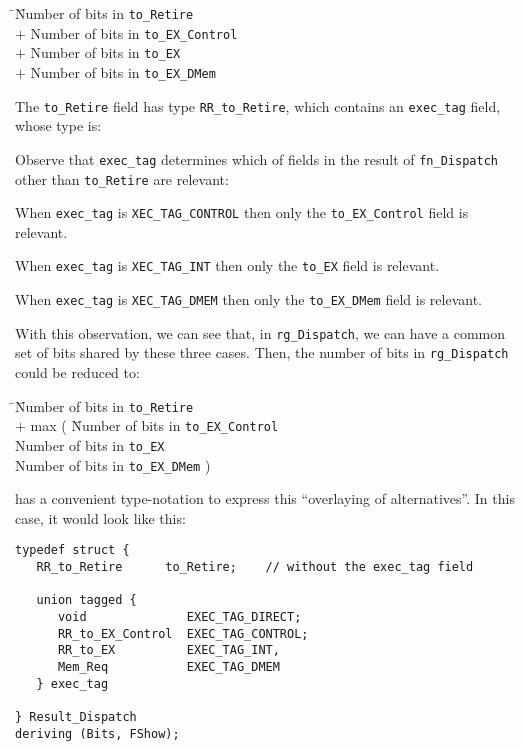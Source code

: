 \begin{tabbing}
\hmm \= \hmm \= Number of bits in {\tt to\_Retire} \\
     \> $+$  \> Number of bits in {\tt to\_EX\_Control} \\
     \> $+$  \> Number of bits in {\tt to\_EX} \\
     \> $+$  \> Number of bits in {\tt to\_EX\_DMem}
\end{tabbing}

The \verb|to_Retire| field has type \verb|RR_to_Retire|, which
contains an \verb|exec_tag| field, whose type is:


Observe that \verb|exec_tag| determines which of fields in the result
of \verb|fn_Dispatch| other than \verb|to_Retire| are relevant:

\begin{tightlist}

 \item When \verb|exec_tag| is \verb|XEC_TAG_CONTROL| then
       only the \verb|to_EX_Control| field is relevant.

 \item When \verb|exec_tag| is \verb|XEC_TAG_INT| then
       only the \verb|to_EX| field is relevant.

 \item When \verb|exec_tag| is \verb|XEC_TAG_DMEM| then
       only the \verb|to_EX_DMem| field is relevant.

\end{tightlist}

With this observation, we can see that, in \verb|rg_Dispatch|, we can
have a common set of bits shared by these three cases.  Then, the
number of bits in \verb|rg_Dispatch| could be reduced to:

\begin{tabbing}
\hmm \= \hmm \= Number of bits in {\tt to\_Retire} \\
     \> $+$  \> max ( \= Number of bits in {\tt to\_EX\_Control} \\
     \>      \>       \> Number of bits in {\tt to\_EX} \\
     \>      \>       \> Number of bits in {\tt to\_EX\_DMem} )
\end{tabbing}

{\BSV} has a convenient type-notation to express this ``overlaying of
alternatives''.  In this case, it would look like this:

{\footnotesize
\begin{Verbatim}[frame=single]
typedef struct {
   RR_to_Retire      to_Retire;    // without the exec_tag field

   union tagged {
      void              EXEC_TAG_DIRECT;
      RR_to_EX_Control  EXEC_TAG_CONTROL;
      RR_to_EX          EXEC_TAG_INT,
      Mem_Req           EXEC_TAG_DMEM
   } exec_tag

} Result_Dispatch
deriving (Bits, FShow);
\end{Verbatim}
}

